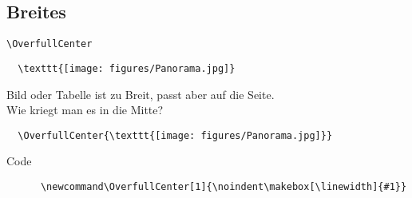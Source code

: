 \subsection{Breites}

\begin{frame}[fragile]{\texttt{\textbackslash OverfullCenter}}
  \begin{lstlisting}
  \texttt{[image: figures/Panorama.jpg]}
  \end{lstlisting}

  \vspace{5pt}

  \vspace{5pt}
  Bild oder Tabelle ist zu Breit, passt aber auf die Seite.\\
  Wie kriegt man es in die Mitte?

  \vspace{5pt}
  \begin{lstlisting}
  \OverfullCenter{\texttt{[image: figures/Panorama.jpg]}}
  \end{lstlisting}

  \vspace{5pt}

  \begin{block}{Code}
    \begin{lstlisting}
      \newcommand\OverfullCenter[1]{\noindent\makebox[\linewidth]{#1}}
    \end{lstlisting}
  \end{block}
\end{frame}

